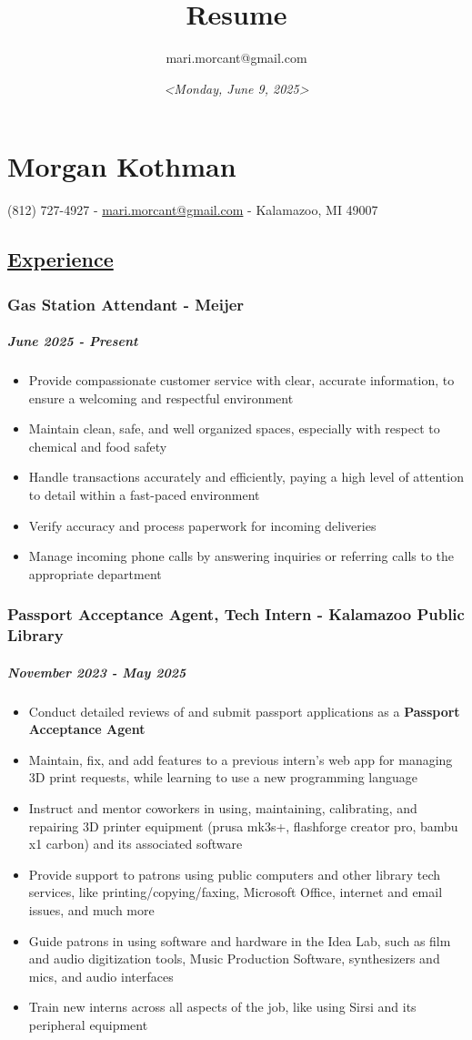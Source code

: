 \documentclass[11pt]{article}
\author{mari.morcant@gmail.com}
\date{\textit{<Monday, June  9, 2025>}}
\title{Resume}
\begin{document}
\section*{Morgan Kothman}
\label{sec:org25f398a}
(812) 727-4927 -
\href{mailto:mari.morcant@gmail.com}{mari.morcant@gmail.com} - Kalamazoo, MI 49007
\subsection*{\underline{Experience}}
\label{sec:org0de4a82}
\subsubsection*{Gas Station Attendant - Meijer}
\label{sec:orgfe902f6}
\subparagraph*{June 2025 - Present}
\label{sec:org2da9472}
\begin{itemize}
\item Provide compassionate customer service with clear, accurate
information, to ensure a welcoming and respectful environment
\item Maintain clean, safe, and well organized spaces, especially with
respect to chemical and food safety
\item Handle transactions accurately and efficiently, paying a high level
of attention to detail within a fast-paced environment
\item Verify accuracy and process paperwork for incoming deliveries
\item Manage incoming phone calls by answering inquiries or referring
calls to the appropriate department
\end{itemize}
\subsubsection*{Passport Acceptance Agent, Tech Intern - Kalamazoo Public Library}
\label{sec:orga697191}
\subparagraph*{November 2023 - May 2025}
\label{sec:org804273f}
\begin{itemize}
\item Conduct detailed reviews of and submit passport applications as a \textbf{Passport Acceptance Agent}
\item Maintain, fix, and add features to a previous intern's web app for managing 3D print requests, while learning to use a new programming language
\item Instruct and mentor coworkers in using, maintaining, calibrating, and repairing 3D printer equipment (prusa mk3s+, flashforge creator pro, bambu x1 carbon) and its associated software
\item Provide support to patrons using public computers and other library tech services, like printing/copying/faxing, Microsoft Office, internet and email issues, and much more
\item Guide patrons in using software and hardware in the Idea Lab, such as film and audio digitization tools, Music Production Software, synthesizers and mics, and audio interfaces
\item Train new interns across all aspects of the job, like using Sirsi and its peripheral equipment
\end{itemize}
\end{document}
